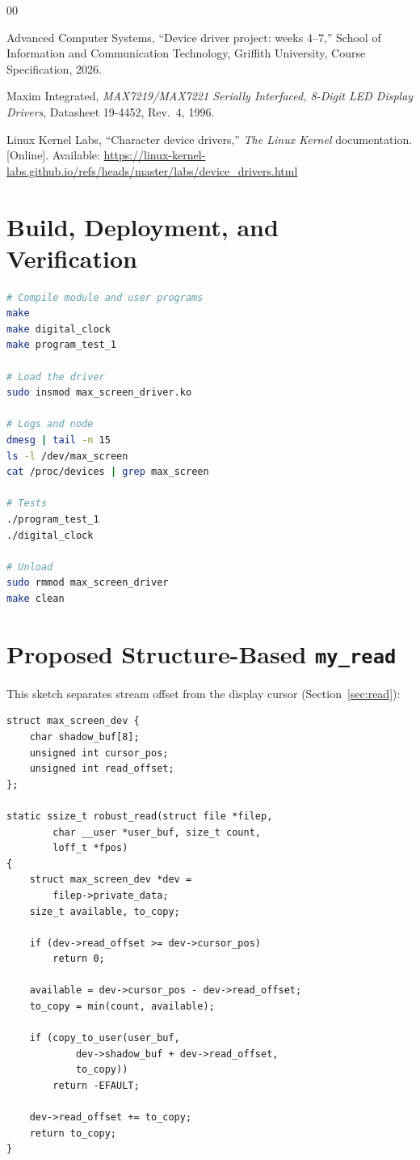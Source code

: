 \documentclass[conference,a4paper]{IEEEtran}
\begin{document}
\begin{thebibliography}{00}

Advanced Computer Systems, ``Device driver project: weeks 4--7,'' School of Information and Communication Technology, Griffith University, Course Specification, 2026.

Maxim Integrated, \emph{MAX7219/MAX7221 Serially Interfaced, 8-Digit LED Display Drivers}, Datasheet 19-4452, Rev.~4, 1996.

Linux Kernel Labs, ``Character device drivers,'' \emph{The Linux Kernel} documentation. [Online]. Available: \url{https://linux-kernel-labs.github.io/refs/heads/master/labs/device_drivers.html}

\end{thebibliography}

\appendices

\section{Build, Deployment, and Verification}

\begin{lstlisting}[language=bash, numbers=none]
# Compile module and user programs
make
make digital_clock
make program_test_1

# Load the driver
sudo insmod max_screen_driver.ko

# Logs and node
dmesg | tail -n 15
ls -l /dev/max_screen
cat /proc/devices | grep max_screen

# Tests
./program_test_1
./digital_clock

# Unload
sudo rmmod max_screen_driver
make clean
\end{lstlisting}

\section{Proposed Structure-Based \texttt{my\_read}}

This sketch separates stream offset from the display cursor (Section~\ref{sec:read}):

\begin{lstlisting}
struct max_screen_dev {
    char shadow_buf[8];
    unsigned int cursor_pos;
    unsigned int read_offset;
};

static ssize_t robust_read(struct file *filep,
        char __user *user_buf, size_t count,
        loff_t *fpos)
{
    struct max_screen_dev *dev =
        filep->private_data;
    size_t available, to_copy;

    if (dev->read_offset >= dev->cursor_pos)
        return 0;

    available = dev->cursor_pos - dev->read_offset;
    to_copy = min(count, available);

    if (copy_to_user(user_buf,
            dev->shadow_buf + dev->read_offset,
            to_copy))
        return -EFAULT;

    dev->read_offset += to_copy;
    return to_copy;
}
\end{lstlisting}
\end{document}
